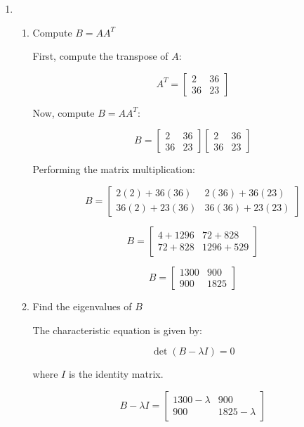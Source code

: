 \documentclass[12pt]{article}
\begin{document}
\begin{enumerate}
\item 
\begin{enumerate}

    \item Compute \( B = A A^T \)
    
    First, compute the transpose of \( A \):

    \[
    A^T =
    \begin{bmatrix}
    2 & 36 \\
    36 & 23
    \end{bmatrix}
    \]

    Now, compute \( B = A A^T \):

    \[
    B =
    \begin{bmatrix}
    2 & 36 \\
    36 & 23
    \end{bmatrix}
    \begin{bmatrix}
    2 & 36 \\
    36 & 23
    \end{bmatrix}
    \]

    Performing the matrix multiplication:

    \[
    B =
    \begin{bmatrix}
    2(2) + 36(36) & 2(36) + 36(23) \\
    36(2) + 23(36) & 36(36) + 23(23)
    \end{bmatrix}
    \]

    \[
    B =
    \begin{bmatrix}
    4 + 1296 & 72 + 828 \\
    72 + 828 & 1296 + 529
    \end{bmatrix}
    \]

    \[
    B =
    \begin{bmatrix}
    1300 & 900 \\
    900 & 1825
    \end{bmatrix}
    \]

    \item Find the eigenvalues of \( B \)

    The characteristic equation is given by:

    \[
    \det(B - \lambda I) = 0
    \]

    where \( I \) is the identity matrix.

    \[
    B - \lambda I =
    \begin{bmatrix}
    1300 - \lambda & 900 \\
    900 & 1825 - \lambda
    \end{bmatrix}
    \]


\end{enumerate}
\end{enumerate}
\end{document}
